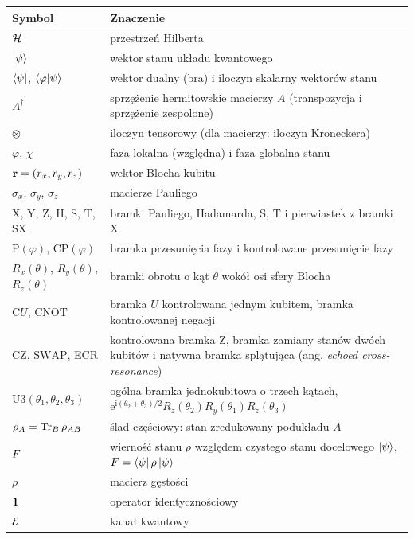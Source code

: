 \begin{longtable}{@{}p{}p{}@{}}
\toprule
\textbf{Symbol} & \textbf{Znaczenie} \\
\midrule
\endhead
$\mathcal{H}$ & przestrzeń Hilberta \\
$\ket{\psi}$ & wektor stanu układu kwantowego \\
$\bra{\psi}$, $\braket{\varphi|\psi}$ & wektor dualny (bra) i iloczyn skalarny wektorów stanu \\
$A^\dagger$ & sprzężenie hermitowskie macierzy $A$ (transpozycja i sprzężenie zespolone) \\
$\otimes$ & iloczyn tensorowy (dla macierzy: iloczyn Kroneckera) \\
$\varphi$, $\chi$ & faza lokalna (względna) i faza globalna stanu \\
$\mathbf{r}=(r_x,r_y,r_z)$ & wektor Blocha kubitu \\
$\sigma_x$, $\sigma_y$, $\sigma_z$ & macierze Pauliego \\
$\mathrm{X}$, $\mathrm{Y}$, $\mathrm{Z}$, $\mathrm{H}$, $\mathrm{S}$, $\mathrm{T}$, $\mathrm{SX}$ & bramki Pauliego, Hadamarda, S, T i pierwiastek z bramki X \\
$\mathrm{P}(\varphi)$, $\mathrm{CP}(\varphi)$ & bramka przesunięcia fazy i kontrolowane przesunięcie fazy \\
$R_x(\theta)$, $R_y(\theta)$, $R_z(\theta)$ & bramki obrotu o kąt $\theta$ wokół osi sfery Blocha \\
$\mathrm{C}U$, $\mathrm{CNOT}$ & bramka $U$ kontrolowana jednym kubitem, bramka kontrolowanej negacji \\
$\mathrm{CZ}$, $\mathrm{SWAP}$, ECR & kontrolowana bramka $\mathrm{Z}$, bramka zamiany stanów dwóch kubitów i natywna bramka splątująca (ang. \emph{echoed cross-resonance}) \\
$\mathrm{U3}(\theta_1,\theta_2,\theta_3)$ & ogólna bramka jednokubitowa o trzech kątach, $\mathrm{e}^{\mathrm{i}(\theta_2+\theta_3)/2}R_z(\theta_2)R_y(\theta_1)R_z(\theta_3)$ \\
$\rho_A=\operatorname{Tr}_B\rho_{AB}$ & ślad częściowy: stan zredukowany podukładu $A$ \\
$F$ & wierność stanu $\rho$ względem czystego stanu docelowego $\ket{\psi}$, $F=\bra{\psi}\rho\ket{\psi}$ \\
$\rho$ & macierz gęstości \\
$\mathbf{1}$ & operator identycznościowy \\
$\mathcal{E}$ & kanał kwantowy \\

\end{longtable}
